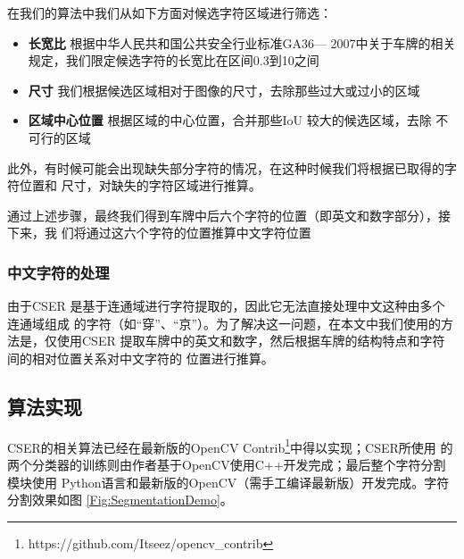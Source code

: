 在我们的算法中我们从如下方面对候选字符区域进行筛选：

\begin{itemize}
\item \textbf{长宽比} 根据中华人民共和国公共安全行业标准GA36— 2007中关于车牌的相关
  规定，我们限定候选字符的长宽比在区间0.3到10之间
\item \textbf{尺寸} 我们根据候选区域相对于图像的尺寸，去除那些过大或过小的区域
\item \textbf{区域中心位置} 根据区域的中心位置，合并那些IoU 较大的候选区域，去除
  不可行的区域
\end{itemize} 

此外，有时候可能会出现缺失部分字符的情况，在这种时候我们将根据已取得的字符位置和
尺寸，对缺失的字符区域进行推算。

通过上述步骤，最终我们得到车牌中后六个字符的位置（即英文和数字部分），接下来，我
们将通过这六个字符的位置推算中文字符位置

\subsubsection{中文字符的处理}

由于CSER 是基于连通域进行字符提取的，因此它无法直接处理中文这种由多个连通域组成
的字符（如“穿”、“京”）。为了解决这一问题，在本文中我们使用的方法是，仅使用CSER
提取车牌中的英文和数字，然后根据车牌的结构特点和字符间的相对位置关系对中文字符的
位置进行推算。

\subsection{算法实现}

CSER的相关算法已经在最新版的OpenCV
Contrib\footnote{https://github.com/Itseez/opencv\_contrib}中得以实现；CSER所使用
的两个分类器的训练则由作者基于OpenCV使用C++开发完成；最后整个字符分割模块使用
Python语言和最新版的OpenCV（需手工编译最新版）开发完成。字符分割效果如图
\ref{Fig:SegmentationDemo}。


